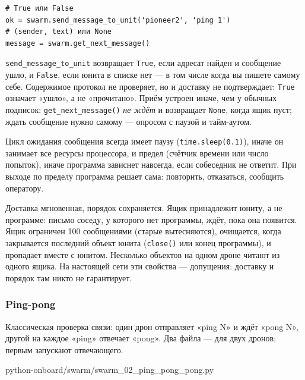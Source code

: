 \begin{codebox}
\begin{verbatim}
# True или False
ok = swarm.send_message_to_unit('pioneer2', 'ping 1')
# (sender, text) или None
message = swarm.get_next_message()
\end{verbatim}
\end{codebox}

\verb|send_message_to_unit| возвращает \verb|True|, если адресат найден и сообщение ушло, и \verb|False|, если юнита в списке нет --- в том числе когда вы пишете самому себе. Содержимое протокол не проверяет, но и доставку не подтверждает: \verb|True| означает «ушло», а не «прочитано». Приём устроен иначе, чем у обычных подписок: \verb|get_next_message()| \emph{не ждёт} и возвращает \verb|None|, когда ящик пуст; ждать сообщение нужно самому --- опросом с паузой и тайм-аутом.

\begin{rulebox}
Цикл ожидания сообщения всегда имеет паузу (\verb|time.sleep(0.1)|), иначе он занимает все ресурсы процессора, и предел (счётчик времени или число попыток), иначе программа зависнет навсегда, если собеседник не ответит. При выходе по пределу программа решает сама: повторить, отказаться, сообщить оператору.
\end{rulebox}

\begin{infobox}
Доставка мгновенная, порядок сохраняется. Ящик принадлежит юниту, а не программе: письмо соседу, у которого нет программы, ждёт, пока она появится. Ящик ограничен 100 сообщениями (старые вытесняются), очищается, когда закрывается последний объект юнита (\verb|close()| или конец программы), и пропадает вместе с юнитом. Несколько объектов на одном дроне читают из одного ящика. На настоящей сети эти свойства --- допущения: доставку и порядок там никто не гарантирует.
\end{infobox}

\subsubsection*{Ping-pong}

Классическая проверка связи: один дрон отправляет «ping N» и ждёт «pong N», другой на каждое «ping» отвечает «pong». Два файла --- для двух дронов; первым запускают отвечающего.

\begin{codefile}[python]{python-onboard/swarm/swarm_02_ping_pong_pong.py}
\end{codefile}

